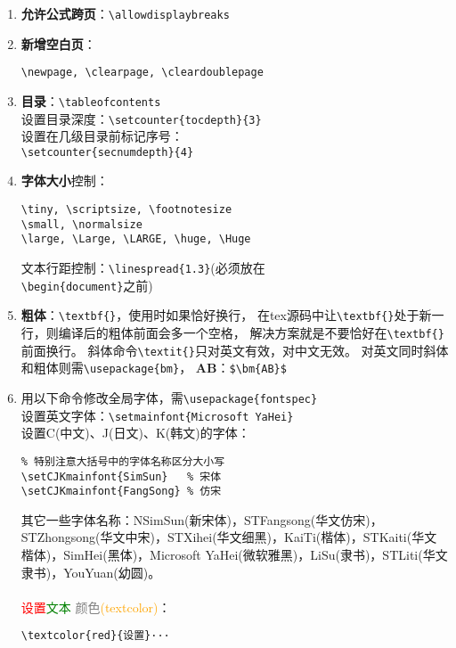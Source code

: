 \documentclass[fontset=windows]{article}
\renewcommand{\today}{\number\year-\number\month-\number\day}
\begin{document}
\begin{multicols}{2}
\begin{enumerate}
\begin{lstlisting}
\footnotetext{\scriptsize#1}
\renewcommand{\thefootnote}{
\ding{\numexpr171+\value{footnote}}}}    
\end{lstlisting} 


\item \textbf{允许公式跨页}：\verb|\allowdisplaybreaks|

\item \textbf{新增空白页}：
\begin{lstlisting}
\newpage, \clearpage, \cleardoublepage
\end{lstlisting} 


\item \textbf{目录}：\verb|\tableofcontents| \\
设置目录深度：\verb|\setcounter{tocdepth}{3}| \\
设置在几级目录前标记序号：\\ 
\verb|\setcounter{secnumdepth}{4}|

\item \textbf{字体大小}控制：
\begin{lstlisting}
\tiny, \scriptsize, \footnotesize
\small, \normalsize
\large, \Large, \LARGE, \huge, \Huge    
\end{lstlisting} 

文本行距控制：\verb|\linespread{1.3}|(必须放在\\
    \verb|\begin{document}|之前) 

\item \textbf{粗体}：\verb|\textbf{}|，使用时如果恰好换行，
在tex源码中让\verb|\textbf{}|处于新一行，则编译后的粗体前面会多一个空格，
解决方案就是不要恰好在\verb|\textbf{}|前面换行。
斜体命令\verb|\textit{}|只对英文有效，对中文无效。
对英文同时斜体和粗体则需\verb|\usepackage{bm}|，
$ \bm{AB} $：\verb|$\bm{AB}$| 

\item 用以下命令修改全局字体，需\verb|\usepackage{fontspec}|\\
设置英文字体：\verb|\setmainfont{Microsoft YaHei}|\\
设置C(中文)、J(日文)、K(韩文)的字体：
\begin{lstlisting}
% 特别注意大括号中的字体名称区分大小写
\setCJKmainfont{SimSun}   % 宋体
\setCJKmainfont{FangSong} % 仿宋
\end{lstlisting} 
其它一些字体名称：NSimSun(新宋体)，STFangsong(华文仿宋)，STZhongsong(华文中宋)，STXihei(华文细黑)，KaiTi(楷体)，STKaiti(华文楷体)，SimHei(黑体)，Microsoft YaHei(微软雅黑)，LiSu(隶书)，STLiti(华文隶书)，YouYuan(幼圆)。\\
\\
\textcolor{red}{设置}\textcolor{green}{文本}
\textcolor{gray}{颜色}\textcolor{orange}{(textcolor)}：
\begin{lstlisting}
\textcolor{red}{设置}···
\end{lstlisting} 


\end{enumerate}
\end{multicols}
\end{document}
